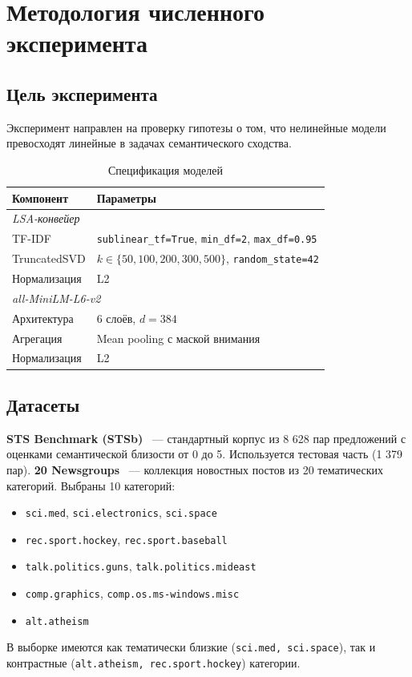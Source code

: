 \section{Методология численного эксперимента}
\subsection{Цель эксперимента}
Эксперимент направлен на проверку гипотезы о том, что нелинейные модели
превосходят линейные в задачах семантического сходства.

\begin{table}[h]
  \centering
  \caption{Спецификация моделей}
  \begin{tabularx}{\linewidth}{lX}
    \toprule
    \textbf{Компонент} & \textbf{Параметры} \\
    \midrule
    \multicolumn{2}{l}{\textit{LSA-конвейер}} \\
    \quad TF-IDF      & \texttt{sublinear\_tf=True},
    \texttt{min\_df=2}, \texttt{max\_df=0.95} \\
    \quad TruncatedSVD & $k \in \{50, 100, 200, 300, 500\}$,
    \texttt{random\_state=42} \\
    \quad Нормализация & L2 \\
    \midrule
    \multicolumn{2}{l}{\textit{all-MiniLM-L6-v2}} \\
    \quad Архитектура  & 6 слоёв, $d = 384$ \\
    \quad Агрегация    & Mean pooling с маской внимания \\
    \quad Нормализация & L2 \\
    \bottomrule
  \end{tabularx}
\end{table}

\subsection{Датасеты}

\textbf{STS Benchmark (STSb)} ~--- стандартный корпус из 8 628 пар
предложений с
оценками семантической близости от 0 до 5. Используется тестовая часть (1 379
пар).
\textbf{20 Newsgroups} ~--- коллекция новостных постов из 20 тематических
категорий. Выбраны 10 категорий:
\begin{itemize}
  \item \texttt{sci.med}, \texttt{sci.electronics}, \texttt{sci.space}
  \item \texttt{rec.sport.hockey}, \texttt{rec.sport.baseball}
  \item \texttt{talk.politics.guns}, \texttt{talk.politics.mideast}
  \item \texttt{comp.graphics}, \texttt{comp.os.ms-windows.misc}
  \item \texttt{alt.atheism}
\end{itemize}
В выборке имеются как тематически близкие (\texttt{sci.med,
sci.space}), так и контрастные
(\texttt{alt.atheism, rec.sport.hockey}) категории.

